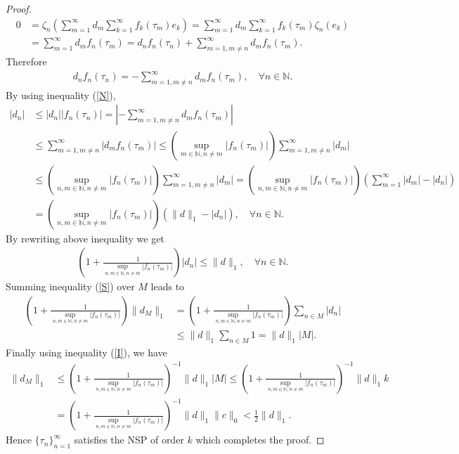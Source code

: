 \documentclass[10pt,a4paper]{amsart}
\begin{document}
\begin{proof}
	 \begin{align*}
0&=\zeta_n\left(\sum_{m=1}^{\infty}d_m\sum_{k=1}^{\infty}f_k(\tau_m)e_k\right)=\sum_{m=1}^{\infty}d_m\sum_{k=1}^{\infty}f_k(\tau_m)\zeta_n(e_k)\\
&=\sum_{m=1}^{\infty}d_mf_n(\tau_m)=d_nf_n(\tau_n)+\sum_{m=1, m\neq n}^{\infty}d_mf_n(\tau_m).
\end{align*}
Therefore 
\begin{align*}
d_nf_n(\tau_n)=-\sum_{m=1, m\neq n}^{\infty}d_mf_n(\tau_m), \quad \forall n \in \mathbb{N}.	
\end{align*}
By using inequality (\ref{N}), 
\begin{align*}
	|d_n|&\leq |d_n||f_n(\tau_n)|=\left|-\sum_{m=1, m\neq n}^{\infty}d_mf_n(\tau_m)\right|\\
	&\leq \sum_{m=1, m\neq n}^{\infty}|d_mf_n(\tau_m)|\leq \left(\displaystyle\sup_{m \in \mathbb{N}, n \neq m}|f_n(\tau_m)|\right)\sum_{m=1, m\neq n}^{\infty}|d_m|\\
	&\leq  \left(\displaystyle\sup_{n, m \in \mathbb{N}, n \neq m}|f_n(\tau_m)|\right)\sum_{m=1, m\neq n}^{\infty}|d_m|=\left(\displaystyle\sup_{n, m \in \mathbb{N}, n \neq m}|f_n(\tau_m)|\right)\left(\sum_{m=1}^{\infty}|d_m|-|d_n|\right)\\
	&=\left(\displaystyle\sup_{n, m \in \mathbb{N}, n \neq m}|f_n(\tau_m)|\right)(\|d\|_1-|d_n|), \quad \forall n \in \mathbb{N}.
\end{align*}
By rewriting above inequality  we get
\begin{align}\label{S}
	\left(1+\frac{1}{\displaystyle\sup_{n, m \in \mathbb{N}, n \neq m}| f_n(\tau_m)|}\right)|d_n|\leq \|d\|_1, \quad \forall n \in \mathbb{N}.
\end{align}
Summing inequality (\ref{S}) over $M$ leads to 
\begin{align*}
	\left(1+\frac{1}{\displaystyle\sup_{n, m \in \mathbb{N}, n \neq m}| f_n(\tau_m)|}\right)\|d_M\|_1&=\left(1+\frac{1}{\displaystyle\sup_{n, m \in \mathbb{N}, n \neq m}| f_n(\tau_m)|}\right)\sum_{n\in M}|d_n|\\
	&\leq \|d\|_1	\sum_{n\in M} 1= \|d\|_1|M|.
\end{align*}
Finally using inequality (\ref{I}), we have 
\begin{align*}
\|d_M\|_1&\leq \left(1+\frac{1}{\displaystyle\sup_{n, m \in \mathbb{N}, n \neq m}| f_n(\tau_m)|}\right)^{-1} \|d\|_1|M|\leq\left(1+\frac{1}{\displaystyle\sup_{n, m \in \mathbb{N}, n \neq m}| f_n(\tau_m)|}\right)^{-1} \|d\|_1k\\
&=\left(1+\frac{1}{\displaystyle\sup_{n, m \in \mathbb{N}, n \neq m}| f_n(\tau_m)|}\right)^{-1} \|d\|_1\|c\|_0<\frac{1}{2}\|d\|_1.
\end{align*}
Hence 	$\{\tau_n \}_{n=1}^\infty$ satisfies the  NSP of order $k$ which completes the proof.
\end{proof}
\end{document}
